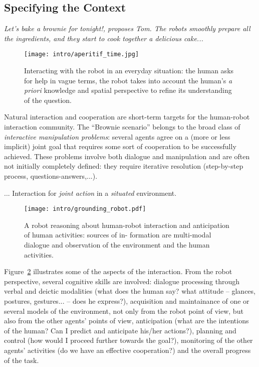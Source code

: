 \subsection{Specifying the Context}
\label{sect|general-context}

{\em \emph{Let's bake a brownie for tonight!}, proposes Tom. The robots smoothly prepare
all the ingredients, and they start to cook together a delicious cake...}

\begin{figure}%
    \centering
    \texttt{[image: intro/aperitif\_time.jpg]} 

    \caption{Interacting with the robot in an everyday situation: the human
    asks for help in vague terms, the robot takes into account the human's {\it
    a priori} knowledge and spatial perspective to refine its understanding of
    the question.} 

    \label{fig|vpt} 
\end{figure}

Natural interaction and cooperation are short-term targets for the human-robot
interaction community.  The ``Brownie scenario'' belongs to the broad class of
\emph{interactive manipulation problems}: several agents agree on a (more or
less implicit) joint goal that requires some sort of cooperation to be
successfully achieved. These problems involve both dialogue and manipulation
and are often not initially completely defined: they require iterative
resolution (step-by-step process, questions-answers,...).

... Interaction for \emph{joint action} in a \emph{situated} environment.


\begin{figure}
    \centering
    \texttt{[image: intro/grounding\_robot.pdf]}
    \caption{A robot reasoning about human-robot interaction and anticipation
    of human activities: sources of in- formation are multi-modal dialogue and
    observation of the environment and the human activities.}
    \label{fig|hri-dec}
\end{figure}


Figure~\ref{fig|hri-dec} illustrates some of the aspects of the interaction.
From the robot perspective, several cognitive skills are involved: dialogue
processing through verbal and deictic modalities (what does the human say? what
attitude -- glances, postures, gestures... -- does he express?), acquisition
and maintainance of one or several models of the environment, not only from the
robot point of view, but also from the other agents' points of view,
anticipation (what are the intentions of the human? Can I predict and
anticipate his/her actions?), planning and control (how would I proceed further
towards the goal?), monitoring of the other agents' activities (do we have an
effective cooperation?) and the overall progress of the task. 

